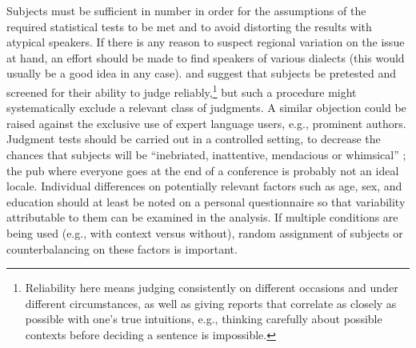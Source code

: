  Subjects must be sufficient in number in order for the assumptions of the required statistical tests to be met and to avoid distorting the results with atypical speakers. If there is any reason to suspect regional variation on the issue at hand, an effort should be made to find speakers of various dialects (this would usually be a good idea in any case). \citet{Snow1975} and \citet{Ringen1979} suggest that subjects be pretested and screened for their ability to judge reliably,\footnote{Reliability here means judging consistently on different occasions and under different circumstances, as well as giving reports that correlate as closely as possible with one's true intuitions, e.g., thinking carefully about possible contexts before deciding a sentence is impossible.}
  but such a procedure might systematically exclude a relevant class of judgments. A similar objection could be raised against the exclusive use of expert language users, e.g., prominent authors. Judgment tests should be carried out in a controlled setting, to decrease the chances that subjects will be ``inebriated, inattentive, mendacious or whimsical'' \citep{Grandy1981}; the pub where everyone goes at the end of a conference is probably not an ideal locale. Individual differences on potentially relevant factors such as age, sex, and education should at least be noted on a personal questionnaire so that variability attributable to them can be examined in the analysis. If multiple conditions are being used (e.g., with context versus without), random assignment of subjects or counterbalancing on these factors is important.

